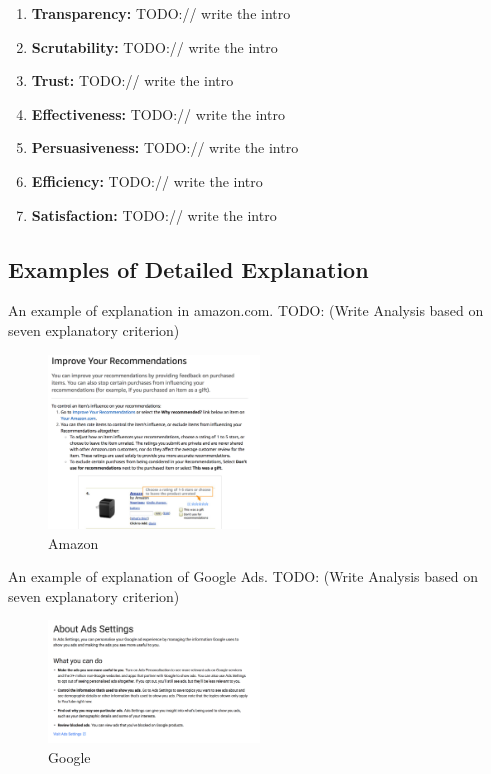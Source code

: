         \begin{enumerate}
            \item \textbf{Transparency:} TODO:// write the intro
            \item \textbf{Scrutability:} TODO:// write the intro
            \item \textbf{Trust:} TODO:// write the intro
            \item \textbf{Effectiveness:} TODO:// write the intro
            \item \textbf{Persuasiveness:} TODO:// write the intro
            \item \textbf{Efficiency:} TODO:// write the intro
            \item \textbf{Satisfaction:} TODO:// write the intro
        \end{enumerate}
    \subsection{Examples of Detailed Explanation}
        An example of explanation in amazon.com.
        TODO: (Write Analysis based on seven explanatory criterion) 
        \begin{figure}[H]
            \centering
            \includegraphics[width=0.5\textwidth]{img/amazon1}
            \caption{Amazon}
            \label{fig:amazon1}
        \end{figure}
        An example of explanation of Google Ads.
        TODO:  (Write Analysis based on seven explanatory criterion) 
        \begin{figure}[H]
            \centering
            \includegraphics[width=0.5\textwidth]{img/google1}
            \caption{Google}
            \label{fig:google1}
        \end{figure}
